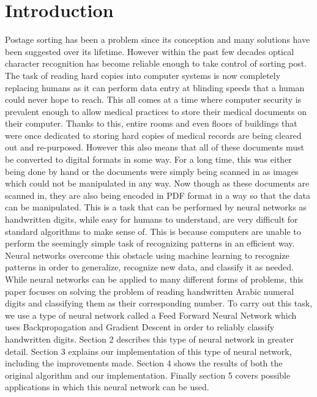 \documentclass[12pt]{article}
\theoremstyle{definition}
\theoremstyle{plain}
\begin{document}
\section{Introduction}
Postage sorting has been a problem since its conception and many solutions have been suggested over its lifetime. However within the past few decades optical character recognition has become reliable enough to take control of sorting post. The task of reading hard copies into computer systems is now completely replacing humans as it can perform data entry at blinding speeds that a human could never hope to reach. This all comes at a time where computer security is prevalent enough to allow medical practices to store their medical documents on their computer. Thanks to this, entire rooms and even floors of buildings that were once dedicated to storing hard copies of medical records are being cleared out and re-purposed. However this also means that all of these documents must be converted to digital formats in some way. For a long time, this was either being done by hand or the documents were simply being scanned in as images which could not be manipulated in any way. Now though as these documents are scanned in, they are also being encoded in PDF format in a way so that the data can be manipulated. This is a task that can be performed by neural networks as handwritten digits, while easy for humans to understand, are very difficult for standard algorithms to make sense of. This is because computers are unable to perform the seemingly simple task of recognizing patterns in an efficient way. Neural networks overcome this obstacle using machine learning to recognize patterns in order to generalize, recognize new data, and classify it as needed. While neural networks can be applied to many different forms of problems, this paper focuses on solving the problem of reading handwritten Arabic numeral digits and classifying them as their corresponding number. To carry out this task, we use a type of neural network called a Feed Forward Neural Network which uses Backpropagation and Gradient Descent in order to reliably classify handwritten digits. Section 2 describes this type of neural network in greater detail. Section 3 explains our implementation of this type of neural network, including the improvements made. Section 4 shows the results of both the original algorithm and our implementation. Finally section 5 covers possible applications in which this neural network can be used.
\end{document}
